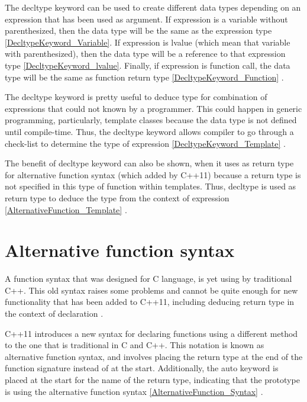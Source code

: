 \documentclass[11pt]{report}
\begin{document}
The decltype keyword can be used to create different data types depending on an expression that has been used as argument.  If expression is a variable without parenthesized, then the data type will be the same as the expression type \ref{DecltypeKeyword_Variable}. If expression is lvalue (which mean that variable with parenthesized), then the data type will be a reference to that expression type \ref{DecltypeKeyword_lvalue}. Finally, if expression is function call, the data type will be the same as function return type \ref{DecltypeKeyword_Function} \cite{Prata:2012:Cpp}.
\newline

The decltype keyword is pretty useful to deduce type for combination of expressions that could not known by a programmer. This could happen in generic programming, particularly, template classes because the data type is not defined until compile-time. Thus, the decltype keyword allows compiler to go through a check-list to determine the type of expression \ref{DecltypeKeyword_Template} \cite{Stroustrup:2012:Cpp11}.
\newline

The benefit of decltype keyword can also be shown, when it uses as return type for alternative function syntax (which added by C++11) because a return type is not specified in this type of function within templates. Thus, decltype is used as return type to deduce the type from the context of expression \ref{AlternativeFunction_Template} \cite{Gregorie:professionalcpp}. 

\section{Alternative function syntax}
\label{section: Alternative function syntax}
A function syntax that was designed for C language, is yet using by traditional C++. This old syntax raises some problems and cannot be quite enough for new functionality that has been added to C++11, including deducing return type in the context of declaration \cite{Gregorie:professionalcpp}.
\newline

C++11 introduces a new syntax for declaring functions using a different method to the one that is traditional in C and C++. This notation is known as alternative function syntax, and involves placing the return type at the end of the function signature instead of at the start. Additionally, the auto keyword is placed at the start for the name of the return type, indicating that the prototype is using the alternative function syntax \ref{AlternativeFunction_Syntax} \cite{Gregorie:professionalcpp}.
\newline
\end{document}
